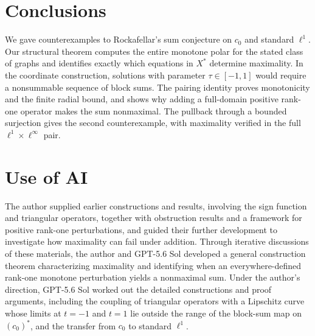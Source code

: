 \documentclass[11pt]{article}
\theoremstyle{definition}
\theoremstyle{remark}
\begin{document}
\section{Conclusions}
\label{sec:conclusion}

We gave counterexamples to Rockafellar's sum conjecture on $c_0$ and standard $\ell^1$. Our structural theorem computes the entire monotone polar for the stated class of graphs and identifies exactly which equations in $X^*$ determine maximality. In the coordinate construction, solutions with parameter $\tau\in[-1,1]$ would require a nonsummable sequence of block sums. The pairing identity proves monotonicity and the finite radial bound, and shows why adding a full-domain positive rank-one operator makes the sum nonmaximal. The pullback through a bounded surjection gives the second counterexample, with maximality verified in the full $\ell^1\times\ell^\infty$ pair.


\section*{Use of AI}
The author supplied earlier constructions and results, involving the sign function and triangular operators, together with obstruction results and a framework for positive rank-one perturbations, and guided their further development to investigate how maximality can fail under addition. Through iterative discussions of these materials, the author and GPT-5.6 Sol developed a general construction theorem characterizing maximality and identifying when an everywhere-defined rank-one monotone perturbation yields a nonmaximal sum.  Under the author's direction, GPT-5.6 Sol worked out the detailed constructions and proof arguments, including the coupling of triangular operators with a Lipschitz curve whose limits at $t=-1$ and $t=1$ lie outside the range of the block-sum map on $(c_0)^*$, and the transfer from $c_0$ to standard $\ell^1$.






\begingroup
\raggedright 

\endgroup
\end{document}
